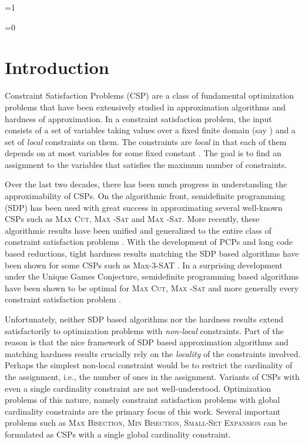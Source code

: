 \documentclass[11pt]{article}
\def\full{1}
\def\showtableofcontents{1}
\theoremstyle{definition}
\newcommand{\problemmacro}[1]{\texorpdfstring{\textsc{#1}}{#1}\xspace}
\newcommand{\maxcut}{\problemmacro{Max Cut}}
\newcommand{\maxtwosat}{\problemmacro{Max -Sat}}
\newcommand{\maxthreesat}{\problemmacro{Max -Sat}}
\newcommand{\smallsetexpansion}{\problemmacro{Small-Set Expansion}}
\newcommand{\minbisection}{\problemmacro{Min Bisection}}
\newcommand{\maxbisection}{\problemmacro{Max Bisection}}
\numberwithin{equation}{section}
\begin{document}
\ifnum\showtableofcontents=1
{
\tableofcontents
\thispagestyle{empty}
\clearpage
 }
\fi


\setcounter{page}{1}
\ifnum\full=0 \vspace{-8pt}\fi

\section{Introduction} \label{sec:intro}

Constraint Satisfaction Problems (CSP) are a class of fundamental
optimization problems that have been extensively studied in
approximation algorithms and hardness of approximation.  In  a
constraint satisfaction problem, the input consists of a set of
variables taking values over a fixed finite domain (say ) and
a set of {\it local} constraints on them.  The constraints are {\it
local} in that each of them depends on at most  variables for some
fixed constant .  The goal is to find an assignment to the
variables that satisfies the maximum number of constraints.

Over the last two decades, there has been much progress in understanding the approximability of
CSPs.  On the algorithmic front, semidefinite programming (SDP) has been
used with great success in approximating several well-known CSPs such
as \maxcut \cite{GoemansW95}, \maxtwosat \cite{CharikarMM07a} and
\maxthreesat \cite{KarloffZ97}.  More recently, these
algorithmic results have been unified and generalized to the entire class of constraint
satisfaction problems \cite{RaghavendraS09b}.  With the development of PCPs and long code based reductions, tight
hardness results matching the SDP based algorithms have been shown for
some CSPs such as Max-3-SAT \cite{Hastad01}.  In a surprising
development under the Unique Games Conjecture, semidefinite programming based algorithms have been shown
to be optimal for \maxcut \cite{KhotKMO07}, \maxtwosat
\cite{Austrin07a} and more generally every constraint satisfaction problem \cite{Raghavendra08}.

Unfortunately, neither SDP based algorithms nor the hardness
results extend satisfactorily to optimization problems with {\it
non-local} constraints.  Part of the reason is that the nice framework of SDP based approximation algorithms and matching
hardness results crucially rely on the {\it locality} of the constraints
involved.  Perhaps the simplest non-local constraint would be to
restrict the cardinality of the assignment, i.e., the number of ones
in the assignment.  Variants of CSPs with even a single cardinality constraint are not well-understood.
Optimization problems of this nature, namely constraint satisfaction problems with global cardinality constraints are the primary focus of this work.
Several important problems such as \maxbisection, \minbisection,
\smallsetexpansion can be formulated as CSPs with a single global cardinality
constraint.
\end{document}
